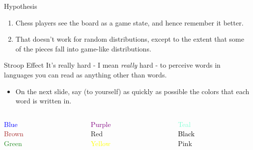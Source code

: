 \documentclass[
  17pt,
  letterpaper,
  ignorenonframetext,
  aspectratio=169,
  xcolor={dvipsnames}]{beamer}
\providecommand{\tightlist}{%
  \setlength{\itemsep}{0pt}\setlength{\parskip}{0pt}}\usepackage{longtable,booktabs,array}
\begin{document}
\begin{frame}{Hypothesis}
\protect\hypertarget{hypothesis}{}
\begin{enumerate}[<+->]
\tightlist
\item
  Chess players see the board as a game state, and hence remember it
  better.
\item
  That doesn't work for random distributions, except to the extent that
  some of the pieces fall into game-like distributions.
\end{enumerate}
\end{frame}

\begin{frame}{Stroop Effect}
\protect\hypertarget{stroop-effect}{}
It's really hard - I mean \emph{really} hard - to perceive words in
languages you can read as anything other than words.

\begin{itemize}[<+->]
\tightlist
\item
  On the next slide, say (to yourself) as quickly as possible the colors
  that each word is written in.
\end{itemize}

\end{frame} \begin{frame}[plain]

\begin{columns}[T]
\begin{column}{0.25\textwidth}
\LARGE{ \textcolor{Blue}{Blue} \\ \textcolor{Brown}{Brown}  \\ \textcolor{ForestGreen}{Green} }
\end{column}

\begin{column}{0.25\textwidth}
\LARGE{  \textcolor{Purple}{Purple}    \\  \textcolor{BrickRed}{Red}    \\     \textcolor{Yellow}{Yellow} }
\end{column}

\begin{column}{0.25\textwidth}
\LARGE{  \textcolor{Aquamarine}{Teal} \\  \textcolor{Black}{Black} \\  \textcolor{Rhodamine}{Pink} }
\end{column}
\end{columns}

\end{frame} \begin{frame}[plain]


\end{frame}
\end{document}

